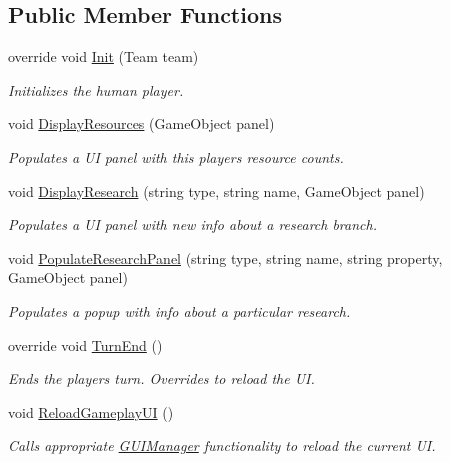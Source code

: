 \subsection*{Public Member Functions}
\begin{DoxyCompactItemize}
\item 
override void \hyperlink{class_human_player_a8e9c0c036d1597acd5b31c965e4c5f2a}{Init} (Team team)
\begin{DoxyCompactList}\small\item\em Initializes the human player. \end{DoxyCompactList}\item 
void \hyperlink{class_human_player_ac38f07d94a7f7f153ed23f6df0d90041}{Display\+Resources} (Game\+Object panel)
\begin{DoxyCompactList}\small\item\em Populates a U\+I panel with this player\textquotesingle{}s resource counts. \end{DoxyCompactList}\item 
void \hyperlink{class_human_player_ace1da6c54244f9f5c9d2be12ca3674e7}{Display\+Research} (string type, string name, Game\+Object panel)
\begin{DoxyCompactList}\small\item\em Populates a U\+I panel with new info about a research branch. \end{DoxyCompactList}\item 
void \hyperlink{class_human_player_a8d98aeaa0acace99d02ca5121061caac}{Populate\+Research\+Panel} (string type, string name, string property, Game\+Object panel)
\begin{DoxyCompactList}\small\item\em Populates a popup with info about a particular research. \end{DoxyCompactList}\item 
override void \hyperlink{class_human_player_a270584c064fe79c046b307fe8eba08d2}{Turn\+End} ()
\begin{DoxyCompactList}\small\item\em Ends the player\textquotesingle{}s turn. Overrides to reload the U\+I. \end{DoxyCompactList}\item 
void \hyperlink{class_human_player_a2450e3824f0c7d6ac820e8ad8313d942}{Reload\+Gameplay\+U\+I} ()
\begin{DoxyCompactList}\small\item\em Calls appropriate \hyperlink{class_g_u_i_manager}{G\+U\+I\+Manager} functionality to reload the current U\+I. \end{DoxyCompactList}\item 

\end{DoxyCompactItemize}
